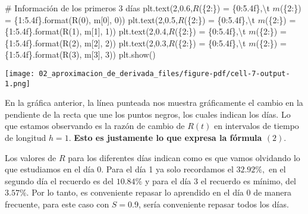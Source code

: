 \documentclass[
  letterpaper,
  DIV=11,
  numbers=noendperiod]{scrreprt}
\newenvironment{Shaded}{\begin{snugshade}}{\end{snugshade}}
\newcommand{\BuiltInTok}[1]{\textcolor[rgb]{0.00,0.23,0.31}{#1}}
\newcommand{\CharTok}[1]{\textcolor[rgb]{0.13,0.47,0.30}{#1}}
\newcommand{\CommentTok}[1]{\textcolor[rgb]{0.37,0.37,0.37}{#1}}
\newcommand{\DecValTok}[1]{\textcolor[rgb]{0.68,0.00,0.00}{#1}}
\newcommand{\FloatTok}[1]{\textcolor[rgb]{0.68,0.00,0.00}{#1}}
\newcommand{\NormalTok}[1]{\textcolor[rgb]{0.00,0.23,0.31}{#1}}
\newcommand{\SpecialCharTok}[1]{\textcolor[rgb]{0.37,0.37,0.37}{#1}}
\newcommand{\StringTok}[1]{\textcolor[rgb]{0.13,0.47,0.30}{#1}}
\begin{document}
\begin{Shaded}
\begin{Highlighting}[]
\CommentTok{\# Información de los primeros 3 días}
\NormalTok{plt.text(}\DecValTok{2}\NormalTok{,}\FloatTok{0.6}\NormalTok{,}\StringTok{\textquotesingle{}$R$(}\SpecialCharTok{\{2:\}}\StringTok{) = }\SpecialCharTok{\{0:5.4f\}}\StringTok{,}\CharTok{\textbackslash{}t}\StringTok{ $m$(}\SpecialCharTok{\{2:\}}\StringTok{) = }\SpecialCharTok{\{1:5.4f\}}\StringTok{\textquotesingle{}}\NormalTok{.}\BuiltInTok{format}\NormalTok{(R(}\DecValTok{0}\NormalTok{), m[}\DecValTok{0}\NormalTok{], }\DecValTok{0}\NormalTok{))}
\NormalTok{plt.text(}\DecValTok{2}\NormalTok{,}\FloatTok{0.5}\NormalTok{,}\StringTok{\textquotesingle{}$R$(}\SpecialCharTok{\{2:\}}\StringTok{) = }\SpecialCharTok{\{0:5.4f\}}\StringTok{,}\CharTok{\textbackslash{}t}\StringTok{ $m$(}\SpecialCharTok{\{2:\}}\StringTok{) = }\SpecialCharTok{\{1:5.4f\}}\StringTok{\textquotesingle{}}\NormalTok{.}\BuiltInTok{format}\NormalTok{(R(}\DecValTok{1}\NormalTok{), m[}\DecValTok{1}\NormalTok{], }\DecValTok{1}\NormalTok{))}
\NormalTok{plt.text(}\DecValTok{2}\NormalTok{,}\FloatTok{0.4}\NormalTok{,}\StringTok{\textquotesingle{}$R$(}\SpecialCharTok{\{2:\}}\StringTok{) = }\SpecialCharTok{\{0:5.4f\}}\StringTok{,}\CharTok{\textbackslash{}t}\StringTok{ $m$(}\SpecialCharTok{\{2:\}}\StringTok{) = }\SpecialCharTok{\{1:5.4f\}}\StringTok{\textquotesingle{}}\NormalTok{.}\BuiltInTok{format}\NormalTok{(R(}\DecValTok{2}\NormalTok{), m[}\DecValTok{2}\NormalTok{], }\DecValTok{2}\NormalTok{))}
\NormalTok{plt.text(}\DecValTok{2}\NormalTok{,}\FloatTok{0.3}\NormalTok{,}\StringTok{\textquotesingle{}$R$(}\SpecialCharTok{\{2:\}}\StringTok{) = }\SpecialCharTok{\{0:5.4f\}}\StringTok{,}\CharTok{\textbackslash{}t}\StringTok{ $m$(}\SpecialCharTok{\{2:\}}\StringTok{) = }\SpecialCharTok{\{1:5.4f\}}\StringTok{\textquotesingle{}}\NormalTok{.}\BuiltInTok{format}\NormalTok{(R(}\DecValTok{3}\NormalTok{), m[}\DecValTok{3}\NormalTok{], }\DecValTok{3}\NormalTok{))}
\NormalTok{plt.show()}
\end{Highlighting}
\end{Shaded}

\texttt{[image: 02\_aproximacion\_de\_derivada\_files/figure-pdf/cell-7-output-1.png]}

En la gráfica anterior, la línea punteada nos muestra gráficamente el
cambio en la pendiente de la recta que une los puntos negros, los cuales
indican los días. Lo que estamos observando es la razón de cambio de
\(R(t)\) en intervalos de tiempo de longitud \(h = 1\). \textbf{Esto es
justamente lo que expresa la fórmula \((2)\)}.

Los valores de \(R\) para los diferentes días indican como es que vamos
olvidando lo que estudiamos en el día 0. Para el día 1 ya solo
recordamos el \(32.92\%,\) en el segundo día el recuerdo es del
\(10.84\%\) y para el día 3 el recuerdo es mínimo, del \(3.57\%\). Por
lo tanto, es conveniente repasar lo aprendido en el día 0 de manera
frecuente, para este caso con \(S=0.9\), sería conveniente repasar todos
los días.
\end{document}
